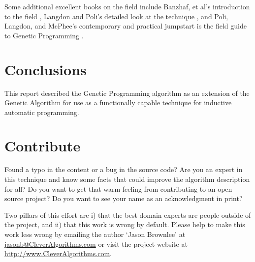 \documentclass[a4paper, 11pt]{article}
\makeatletter
\newcommand{\myreportauthor}{Jason Brownlee}
\newcommand{\myreportemail}{jasonb@CleverAlgorithms.com}
\newcommand{\myreportwebsite}{http://www.CleverAlgorithms.com}
\makeatother
\begin{document}
Some additional excellent books on the field include Banzhaf, et al's introduction to the field \cite{Banzhaf1998}, Langdon and Poli's detailed look at the technique \cite{Langdon2002}, and Poli, Langdon, and McPhee's contemporary and practical jumpstart is the field guide to Genetic Programming \cite{Poli2008}.

% 
% 
\section{Conclusions}
\label{sec:conclusions}
This report described the Genetic Programming algorithm as an extension of the Genetic Algorithm for use as a functionally capable technique for inductive automatic programming. 

% 
% 
\section{Contribute}
\label{sec:contribute}
Found a typo in the content or a bug in the source code? 
Are you an expert in this technique and know some facts that could improve the algorithm description for all?
Do you want to get that warm feeling from contributing to an open source project? 
Do you want to see your name as an acknowledgment in print?

Two pillars of this effort are i) that the best domain experts are people outside of the project, and ii) that this work is wrong by default. 
Please help to make this work less wrong by emailing the author `\myreportauthor' at \url{\myreportemail} or visit the project website at \url{\myreportwebsite}.



\end{document}
